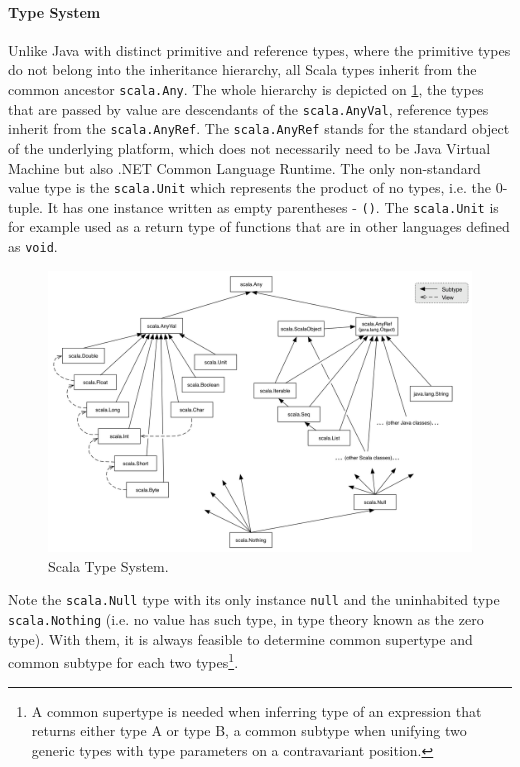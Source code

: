 \documentclass[12pt,a4paper]{report}
\begin{document}
\paragraph{Type System} Unlike Java with distinct primitive and reference types, where the primitive types do not belong into the inheritance hierarchy, all Scala types inherit from the common ancestor \texttt{scala.Any}. The whole hierarchy is depicted on \ref{ScalaTypeSystem}, the types that are passed by value are descendants of the \texttt{scala.AnyVal}, reference types inherit from the \texttt{scala.AnyRef}. The \texttt{scala.AnyRef} stands for the standard object of the underlying platform, which does not necessarily need to be Java Virtual Machine but also .NET Common Language Runtime. The only non-standard value type is the \texttt{scala.Unit} which represents the product of no types, i.e. the 0-tuple. It has one instance written as empty parentheses - \texttt{()}. The \texttt{scala.Unit} is for example used as a return type of functions that are in other languages defined as \texttt{void}.

\begin{figure}[ht]
  \centering
	\includegraphics[width=\linewidth,height=\textheight,keepaspectratio]{img/ScalaTypeSystem.png}
	\caption{Scala Type System.}
	\label{ScalaTypeSystem}
\end{figure}

Note the \texttt{scala.Null} type with its only instance \texttt{null} and the uninhabited type \texttt{scala.Nothing} (i.e. no value has such type, in type theory known as the zero type). With them, it is always feasible to determine common supertype and common subtype for each two types\footnote{A common supertype is needed when inferring type of an expression that returns either type A or type B, a common subtype when unifying two generic types with type parameters on a contravariant position.}.
\end{document}

